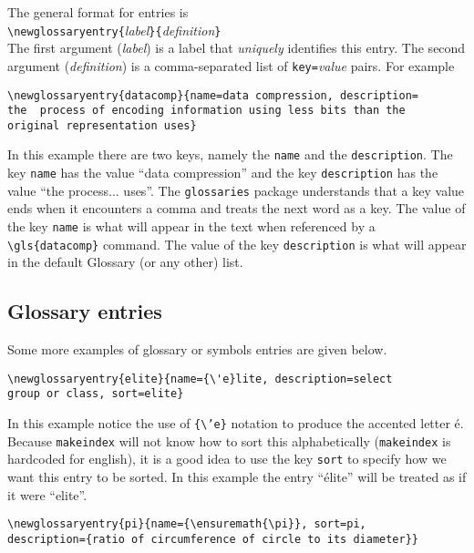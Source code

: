 The general format for entries is\\
\texttt{\textbackslash newglossaryentry\{}\textit{label}\texttt{\}\{}\textit{definition}\texttt{\}}\\
The first argument (\textit{label}) is a label that \emph{uniquely} identifies this entry. The second argument (\textit{definition}) is a comma-separated list of \texttt{key=}\textit{value} pairs. For example
\begin{lstlisting}
\newglossaryentry{datacomp}{name=data compression, description=
the  process of encoding information using less bits than the 
original representation uses}
\end{lstlisting}
In this example there are two keys, namely the \texttt{name} and the \texttt{description}. The key \texttt{name} has the value ``data compression'' and the key \texttt{description} has the value ``the process... uses''. The \texttt{glossaries} package understands that a key value ends when it encounters a comma and treats the next word as a key. The value of the key \texttt{name} is what will appear in the text when referenced by a \texttt{\textbackslash gls\{datacomp\}} command. The value of the key \texttt{description} is what will appear in the default Glossary (or any other) list.


\subsection{Glossary entries}
Some more examples of glossary or symbols entries are given below.
\begin{lstlisting}
\newglossaryentry{elite}{name={\'e}lite, description=select
group or class, sort=elite}
\end{lstlisting}

In this example notice the use of \texttt{\{\textbackslash'e\}} notation to produce the accented letter {\'e}. Because \texttt{makeindex} will not know how to sort this alphabetically (\texttt{makeindex} is hardcoded for english), it is a good idea to use the key \texttt{sort} to specify how we want this entry to be sorted. In this example the entry ``\'elite'' will be treated as if it were ``elite''.
\begin{lstlisting}
\newglossaryentry{pi}{name={\ensuremath{\pi}}, sort=pi, 
description={ratio of circumference of circle to its diameter}}
\end{lstlisting}

